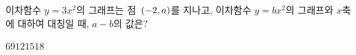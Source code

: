 이차함수 $y=3x^2$의 그래프는 점~$(-2{,}\mkern3mu a)$를 지나고, 이차함수 $y=bx^2$의 그래프와 $x$축에 대하여 대칭일 때, $a-b$의 값은? 
\begin{choices32}{$6$}{$9$}{$12$}{$15$}{$18$}\end{choices32}
